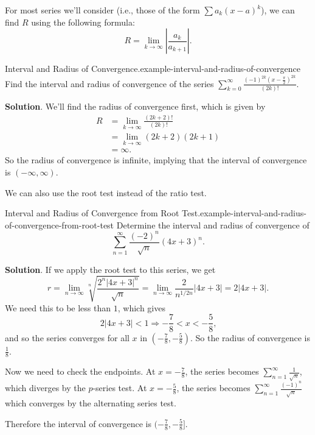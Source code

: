 \documentclass[10pt,]{book}
\numberwithin{equation}{section}
\newcommand{\lt}{<}
\newcommand{\amp}{&}
\begin{document}
For most series we'll consider (i.e., those of the form \(\sum a_{k}(x - a)^{k}\)), we can find \(R\) using the following formula:%
\begin{equation*}
R = \lim_{k\to\infty}\left|\frac{a_{k}}{a_{k+1}}\right|\text{.}
\end{equation*}
%
\begin{example}{Interval and Radius of Convergence.}{example-interval-and-radius-of-convergence}%
\hypertarget{p-941}{}%
Find the interval and radius of convergence of the series \(\sum_{k = 0}^{\infty}\frac{(-1)^{2k}(x - \frac{\pi}{2})^{2k}}{(2k)!}\).%
\par\smallskip%
\noindent\textbf{Solution}.\hypertarget{solution-191}{}\quad%
\hypertarget{p-942}{}%
We'll find the radius of convergence first, which is given by%
\begin{align*}
R \amp = \lim_{k\to\infty}\frac{(2k + 2)!}{(2k)!} \\
\amp = \lim_{k\to\infty} (2k + 2)(2k + 1) \\
\amp = \infty \text{.}
\end{align*}
So the radius of convergence is infinite, implying that the interval of convergence is \((-\infty,\infty)\).%
\end{example}
\hypertarget{p-943}{}%
We can also use the root test instead of the ratio test.%
\begin{example}{Interval and Radius of Convergence from Root Test.}{example-interval-and-radius-of-convergence-from-root-test}%
\hypertarget{p-944}{}%
Determine the interval and radius of convergence of%
\begin{equation*}
\sum_{n = 1}^{\infty} \frac{(-2)^{n}}{\sqrt{n}}(4x + 3)^{n}\text{.}
\end{equation*}
%
\par\smallskip%
\noindent\textbf{Solution}.\hypertarget{solution-192}{}\quad%
\hypertarget{p-945}{}%
If we apply the root test to this series, we get%
\begin{equation*}
r = \lim_{n\to\infty}\sqrt[n]{\frac{2^{n}|4x + 3|^{n}}{\sqrt{n}}} = \lim_{n\to\infty}\frac{2}{n^{1/2n}}|4x + 3| = 2|4x + 3|\text{.}
\end{equation*}
We need this to be less than \(1\), which gives%
\begin{equation*}
2|4x + 3| \lt 1 \Rightarrow -\frac{7}{8} \lt x \lt -\frac{5}{8}\text{,}
\end{equation*}
and so the series converges for all \(x\) in \((-\frac{7}{8}, -\frac{5}{8})\). So the radius of convergence is \(\frac{1}{8}\).%
\par
\hypertarget{p-946}{}%
Now we need to check the endpoints. At \(x = -\frac{7}{8}\), the series becomes \(\sum_{n = 1}^{\infty}\frac{1}{\sqrt{n}}\), which diverges by the \(p\)-series test. At \(x = -\frac{5}{8}\), the series becomes \(\sum_{n=1}^{\infty}\frac{(-1)^{n}}{\sqrt{n}}\) which converges by the alternating series test.%
\par
\hypertarget{p-947}{}%
Therefore the interval of convergence is \((-\frac{7}{8}, -\frac{5}{8}]\).%
\end{example}
%
%
\typeout{************************************************}
\typeout{************************************************}
%
\end{document}
